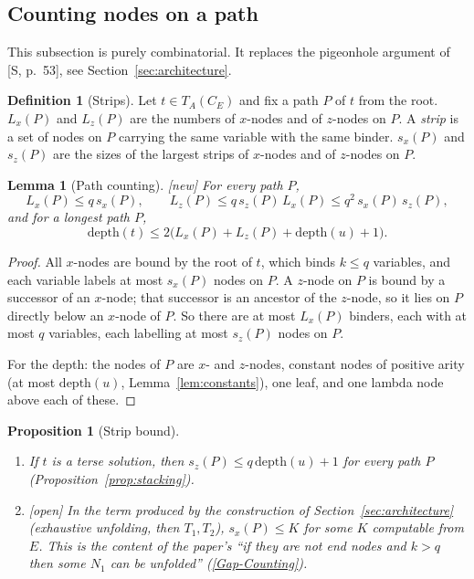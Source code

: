 \documentclass[11pt]{article}
\newcommand{\depth}{\mathrm{depth}}
\newcommand{\CE}{C_E}
\newcommand{\New}{\textsf{[new]}}
\newcommand{\Open}{\textsf{\color{red!60!black}[open]}}
\theoremstyle{plain}
\newtheorem{proposition}[theorem]{Proposition}
\newtheorem{lemma}[theorem]{Lemma}
\theoremstyle{definition}
\newtheorem{definition}[theorem]{Definition}
\theoremstyle{remark}
\newcommand{\GapCounting}{\hyperref[gap:count]{[Gap-Counting]}}
\begin{document}
\subsection{Counting nodes on a path}\label{sec:pathcount}

This subsection is purely combinatorial.  It replaces the pigeonhole
argument of [S, p.~53], see Section~\ref{sec:architecture}.

\begin{definition}[Strips]\label{def:strip}
Let $t\in T_A(\CE)$ and fix a path $P$ of $t$ from the root.  $L_x(P)$
and $L_z(P)$ are the numbers of $x$-nodes and of $z$-nodes on $P$.  A
\emph{strip} is a set of nodes on $P$ carrying the same variable with
the same binder.  $s_x(P)$ and $s_z(P)$ are the sizes of the largest
strips of $x$-nodes and of $z$-nodes on $P$.
\end{definition}

\begin{lemma}[Path counting]\label{lem:pathcount}
\New{} For every path $P$,
\[
L_x(P)\le q\,s_x(P),\qquad L_z(P)\le q\,s_z(P)\,L_x(P)\le q^2\,s_x(P)\,s_z(P),
\]
and for a longest path $P$,
\[
\depth(t)\le 2\bigl(L_x(P)+L_z(P)+\depth(u)+1\bigr).
\]
\end{lemma}
\begin{proof}
All $x$-nodes are bound by the root of $t$, which binds $k\le q$
variables, and each variable labels at most $s_x(P)$ nodes on $P$.  A
$z$-node on $P$ is bound by a successor of an $x$-node; that successor is
an ancestor of the $z$-node, so it lies on $P$ directly below an
$x$-node of $P$.  So there are at most $L_x(P)$ binders, each with at
most $q$ variables, each labelling at most $s_z(P)$ nodes on $P$.

For the depth: the nodes of $P$ are $x$- and $z$-nodes, constant nodes
of positive arity (at most $\depth(u)$, Lemma~\ref{lem:constants}), one
leaf, and one lambda node above each of these.
\end{proof}

\begin{proposition}[Strip bound]\label{prop:stripbound}
\begin{enumerate}
\item If $t$ is a terse solution, then $s_z(P)\le q\,\depth(u)+1$ for
  every path $P$ (Proposition~\ref{prop:stacking}).
\item \Open{} In the term produced by the construction of
  Section~\ref{sec:architecture} (exhaustive unfolding, then $T_1,T_2$),
  $s_x(P)\le K$ for some $K$ computable from $E$.  This is the content
  of the paper's ``if they are not end nodes and $k>q$ then some $N_1$
  can be unfolded'' (\GapCounting{}).
\end{enumerate}
\end{proposition}
\end{document}
